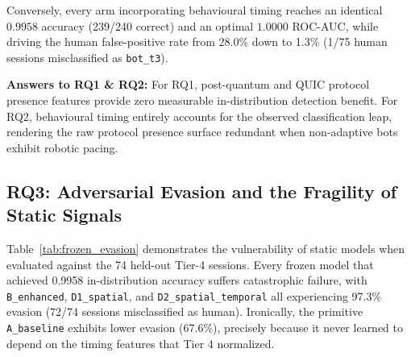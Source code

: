 \documentclass[conference]{IEEEtran}
\begin{document}
\begin{table}[t]
\caption{In-Distribution Performance on Held-Out Test Set ($n=240$)}
\label{tab:in_dist}
\centering
{}
\end{table}

Conversely, every arm incorporating behavioural timing reaches an identical $0.9958$ accuracy (239/240 correct) and an optimal $1.0000$ ROC-AUC, while driving the human false-positive rate from 28.0\% down to 1.3\% (1/75 human sessions misclassified as \texttt{bot\_t3}). 

\noindent\textbf{Answers to RQ1 \& RQ2:} For RQ1, post-quantum and QUIC protocol presence features provide zero measurable in-distribution detection benefit. For RQ2, behavioural timing entirely accounts for the observed classification leap, rendering the raw protocol presence surface redundant when non-adaptive bots exhibit robotic pacing.

\subsection{RQ3: Adversarial Evasion and the Fragility of Static Signals}
Table~\ref{tab:frozen_evasion} demonstrates the vulnerability of static models when evaluated against the 74 held-out Tier-4 sessions. Every frozen model that achieved 0.9958 in-distribution accuracy suffers catastrophic failure, with \texttt{B\_enhanced}, \texttt{D1\_spatial}, and \texttt{D2\_spatial\_temporal} all experiencing 97.3\% evasion (72/74 sessions misclassified as human). Ironically, the primitive \texttt{A\_baseline} exhibits lower evasion (67.6\%), precisely because it never learned to depend on the timing features that Tier 4 normalized.
\end{document}
